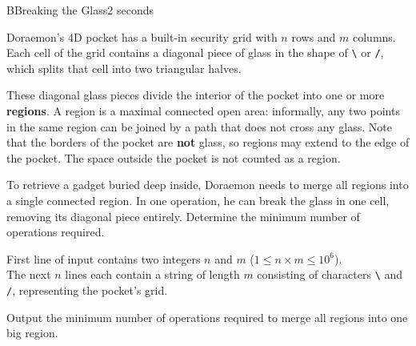 \begin{problem}{B}{Breaking the Glass}{2 seconds}

\noindent
Doraemon's 4D pocket has a built-in security grid with $n$ rows and $m$ columns.
Each cell of the grid contains a diagonal piece of glass in the shape of \verb|\| or \verb|/|, which splits that cell into two triangular halves.

\noindent
These diagonal glass pieces divide the interior of the pocket into one or more \textbf{regions}.
A region is a maximal connected open area: informally, any two points in the same region can be joined by a path that does not cross any glass.
Note that the borders of the pocket are \textbf{not} glass, so regions may extend to the edge of the pocket.
The space outside the pocket is not counted as a region.

\noindent
To retrieve a gadget buried deep inside, Doraemon needs to merge all regions into a single connected region.
In one operation, he can break the glass in one cell, removing its diagonal piece entirely.
Determine the minimum number of operations required.

\InputFile

\noindent
First line of input contains two integers $n$ and $m$ ($1 \le n \times m \le 10^6$).\\
The next $n$ lines each contain a string of length $m$ consisting of characters \verb|\| and \verb|/|, representing the pocket's grid.

\OutputFile

\noindent
Output the minimum number of operations required to merge all regions into one big region.

\Examples

\begin{example}
\end{example}


\end{problem}
